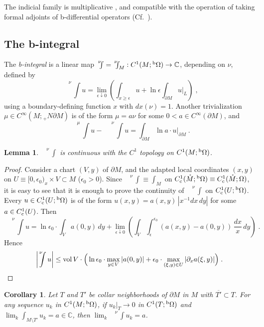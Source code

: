 \documentclass{memo-l}
\theoremstyle{plain}
\newtheorem{lem}[thm]{Lemma}
\newtheorem{cor}[thm]{Corollary}
\theoremstyle{definition}
\theoremstyle{remark}
\newcommand{\C}{\mathbb{C}}
\newcommand{\vol}{\operatorname{vol}}
\newcommand{\co}{{\text{\rm c}}}
\newcommand{\bOmega}{{}^{\text{\rm b}}\Omega}
\newcommand{\nuint}{\!\!\!\!\!{\phantom{\int}}^\nu\!\!\!\!\int}
\newcommand{\smallnuint}{\!\!\!{\phantom{\int}}^\nu\!\!\!\int}
\newcommand{\muint}{\!\!\!\!\!{\phantom{\int}}^\mu\!\!\!\!\int}
\numberwithin{section}{chapter}
\numberwithin{equation}{section}%
\begin{document}
The indicial family is multiplicative  \cite[Corollary of Proposition~5.20]{Melrose1993}, and compatible with the operation of taking formal adjoints of b-differential operators (Cf.~\cite[Eq.~(4.112)]{Melrose1993}).




\subsection{The b-integral}\label{ss: b-int}

The \emph{b-integral}  is a linear map $\smallnuint=\smallnuint_M:C^1(M;\bOmega)\to\C$, \index{$\smallnuint$} depending on $\nu$, defined by \cite[Lemma~4.62]{Melrose1993}
\[
\nuint u=\lim_{\epsilon\downarrow0}\left(\int_{x\ge\epsilon} u+\ln\epsilon\int_{\partial M} u|_L\right)\;,
\] 
using a boundary-defining function $x$ with $dx(\nu)=1$. Another trivialization $\mu\in C^\infty(M;{}_+N\partial M)$ is of the form $\mu=a\nu$ for some $0<a\in C^\infty(\partial M)$, and 
\[
\muint u-\nuint u=\int_{\partial M}\ln a\cdot u|_{\partial M}\;.
\]

\begin{lem}\label{l: smallnuint is cont}
$\smallnuint$ is continuous with the $C^1$ topology on $C^1(M;\bOmega)$.
\end{lem}

\begin{proof}
Consider a chart $(V,y)$ of $\partial M$, and the adapted local coordinates $(x,y)$ on $U\equiv[0,\epsilon_0)_x\times V\subset M$ ($\epsilon_0>0$). Since $\smallnuint\equiv\int_M$ on $C^1_\co(\mathring M;\bOmega)\equiv C^1_\co(\mathring M;\Omega)$, it is easy to see that it is enough to prove the continuity of $\smallnuint$ on $C^1_\co(U;\bOmega)$. Every $u\in C^1_\co(U;\bOmega)$ is of the form $u(x,y)=a(x,y)\,|x^{-1}dx\,dy|$ for some $a\in C^1_\co(U)$. Then 
\[
\nuint u=\ln\epsilon_0\cdot\int_Va(0,y)\,dy
+ \lim_{\epsilon\downarrow0}\left(\int_V\int_\epsilon^{\epsilon_0}(a(x,y)-a(0,y))\,\frac{dx}{x}\,dy\right)\;.
\]
Hence
\[
\left|\nuint u\right|\le\vol V\cdot\Big(\ln\epsilon_0\cdot\max_{y\in V}|a(0,y)|
+\epsilon_0\cdot\max_{(\xi,y)\in U}|\partial_xa(\xi,y)|\Big)\;.\qedhere
\]
\end{proof}

\begin{cor}\label{c: smallnuint is cont}
Let $T$ and $T'$ be collar neighborhoods of $\partial M$ in $M$ with $\overline{T'}\subset T$. For any sequence $u_k$ in $C^1(M;\bOmega)$, if $u_k|_T\to0$ in $C^1(T;\bOmega)$ and $\lim_k\int_{M\setminus T'}u_k=a\in\C$, then $\lim_k\smallnuint u_k=a$.
\end{cor}
\end{document}
